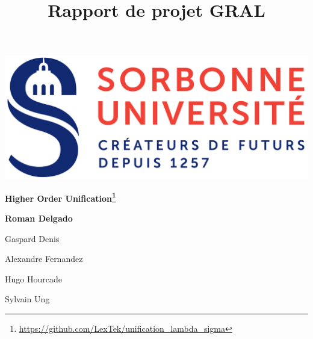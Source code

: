 \begin{titlepage}
\title{Rapport de projet GRAL}
\author{}
\maketitle
\thispagestyle{empty}
\begin{center}
\includegraphics[scale=0.2]{images/logo_sorbonne.png}
\end{center}
\hrulefill
\begin{center}\bfseries\Huge
  Higher Order Unification\footnote{\url{https://github.com/LexTek/unification_lambda_sigma}}
\end{center}
\hrulefill
\vspace*{1cm}
\begin{center}\bfseries\Large
Roman Delgado

Gaspard Denis

Alexandre Fernandez

Hugo Hourcade

Sylvain Ung
\end{center}

\end{titlepage}